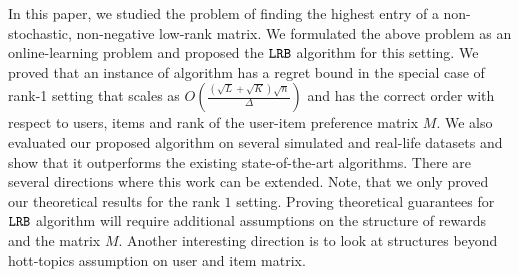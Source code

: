 In this paper, we studied the problem of finding the highest entry of a non-stochastic, non-negative low-rank matrix. We formulated the above problem as an online-learning problem and proposed the ${\tt LRB}$ algorithm for this setting. We proved that an instance of algorithm has a regret bound in the special case of rank-1 setting that scales as $O\left(\frac{\left(\sqrt{L } + \sqrt{K }\right) \sqrt{n}}{\Delta}\right)$ and has the correct order with respect to users, items and rank of the user-item preference matrix $M$. We also evaluated our proposed algorithm on several simulated and real-life datasets and show that it outperforms the existing state-of-the-art algorithms. There are several directions where this work can be extended. Note, that we only proved our theoretical results for the rank $1$ setting. Proving theoretical guarantees for ${\tt LRB}$ algorithm will require additional assumptions on the structure of rewards and the matrix $M$. Another interesting direction is to look at structures beyond hott-topics assumption on user and item matrix.

